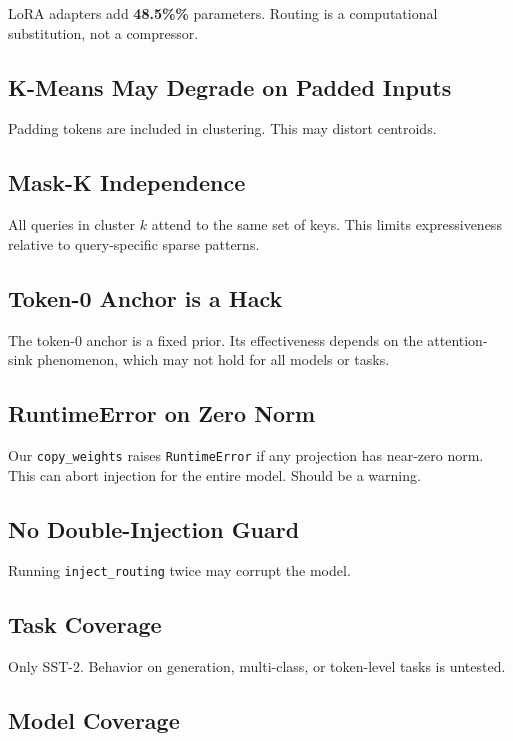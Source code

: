 LoRA adapters add \textbf{48.5\%\%} parameters. Routing is a computational 
substitution, not a compressor.

\subsection{K-Means May Degrade on Padded Inputs}

Padding tokens are included in clustering. This may distort centroids.

\subsection{Mask-K Independence}

All queries in cluster $k$ attend to the same set of keys. This limits 
expressiveness relative to query-specific sparse patterns.

\subsection{Token-0 Anchor is a Hack}

The token-0 anchor is a fixed prior. Its effectiveness depends on the 
attention-sink phenomenon, which may not hold for all models or tasks.

\subsection{RuntimeError on Zero Norm}

Our \texttt{copy\_weights} raises \texttt{RuntimeError} if any projection has near-zero 
norm. This can abort injection for the entire model. Should be a warning.

\subsection{No Double-Injection Guard}

Running \texttt{inject\_routing} twice may corrupt the model.

\subsection{Task Coverage}

Only SST-2. Behavior on generation, multi-class, or token-level tasks is 
untested.

\subsection{Model Coverage}

